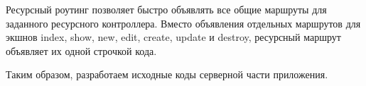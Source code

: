 Ресурсный роутинг позволяет быстро объявлять все общие маршруты для заданного ресурсного контроллера. Вместо объявления
отдельных маршрутов для экшнов index, show, new, edit, create, update и destroy, ресурсный маршрут объявляет их одной
строчкой кода.

Таким образом, разработаем исходные коды серверной части приложения.
